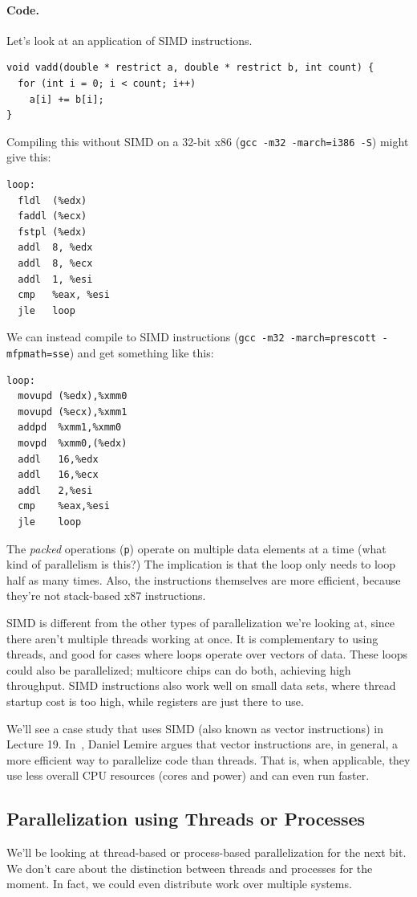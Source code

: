 \documentclass[a4paper]{report}
\begin{document}
\paragraph{Code.} Let's look at an application of SIMD instructions.

\begin{verbatim}
void vadd(double * restrict a, double * restrict b, int count) {
  for (int i = 0; i < count; i++)
    a[i] += b[i];
}
\end{verbatim}

Compiling this without SIMD on a 32-bit x86 ({\tt gcc -m32 -march=i386 -S}) might give this:
\begin{verbatim}
loop:
  fldl  (%edx)
  faddl (%ecx)
  fstpl (%edx)
  addl  8, %edx
  addl  8, %ecx
  addl  1, %esi
  cmp   %eax, %esi
  jle   loop
\end{verbatim}

We can instead compile to SIMD instructions ({\tt gcc -m32 -march=prescott -mfpmath=sse})
and get something like this:
\begin{verbatim}
loop:
  movupd (%edx),%xmm0
  movupd (%ecx),%xmm1
  addpd  %xmm1,%xmm0
  movpd  %xmm0,(%edx)
  addl   16,%edx
  addl   16,%ecx
  addl   2,%esi
  cmp    %eax,%esi
  jle    loop
\end{verbatim}
The \emph{packed} operations ({\tt p}) operate on multiple data
elements at a time (what kind of parallelism is this?)
The implication is that the loop only needs to loop half as many times.
Also, the instructions themselves are more efficient, because they're
not stack-based x87 instructions.

SIMD is different from the other types of parallelization we're
looking at, since there aren't multiple threads working at once.
It is complementary to using threads, and good for cases
where loops operate over vectors of data. These loops could also be
parallelized; multicore chips can do both, achieving high throughput.
SIMD instructions also work well on small data sets, where thread startup
cost is too high, while registers are just there to use.

We'll see a case study that uses SIMD (also known as vector
instructions) in Lecture 19. In~\cite{lemire18:_multic_simd}, Daniel Lemire argues that vector
instructions are, in general, a more efficient way to parallelize code
than threads. That is, when applicable, they use less overall CPU
resources (cores and power) and can even run faster.

\subsection*{Parallelization using Threads or Processes}
We'll be looking at thread-based or process-based parallelization for the
next bit. We don't care about the distinction between threads and processes
for the moment. In fact, we could even distribute work over multiple systems.
\end{document}
